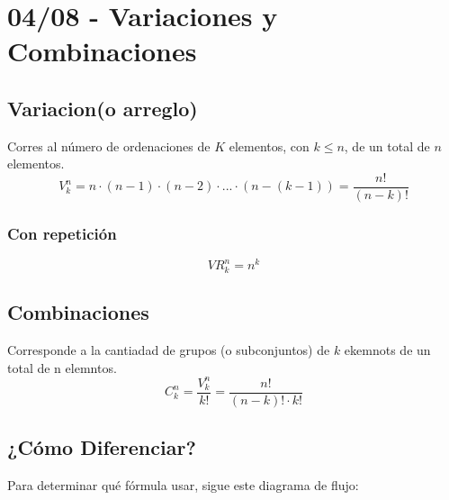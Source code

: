 \documentclass[12pt, letterpaper]{article}
\begin{document}
\section{04/08 - Variaciones y Combinaciones}
    \subsection{Variacion(o arreglo)}
        Corres al número de ordenaciones de $K$ elementos, con $k \leq n$, de un total de $n$ elementos.
        \[V_k^n = n \cdot (n - 1) \cdot (n - 2) \cdot ... \cdot (n - (k - 1)) = \frac{n!}{(n - k)!} \]
        \subsubsection*{Con repetición}
            \[VR_k^n = n^k \]
    \subsection{Combinaciones} Corresponde a la cantiadad de grupos (o subconjuntos) de $k$ ekemnots de un total de n elemntos. 
        \[C_k^n = \frac{V_k^n}{k!} = \frac{n!}{(n - k)! \cdot k!} \]

    \subsection*{¿Cómo Diferenciar?}
Para determinar qué fórmula usar, sigue este diagrama de flujo:
\end{document}

